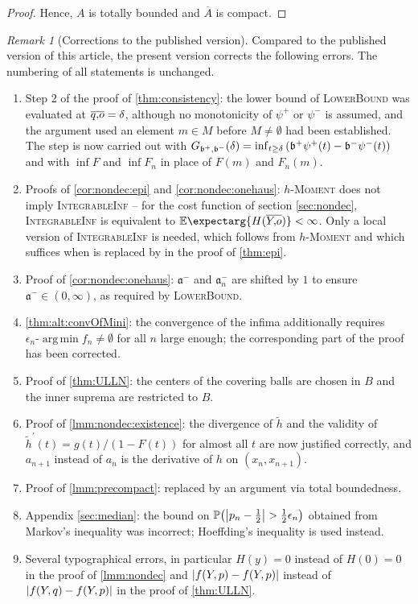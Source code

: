 \documentclass{scrartcl}
\newcommand{\PrOf}[1]{\Pr\mathopen{}\lb #1 \rb\mathclose{}}
\newcommand{\Ex}{\E\expectarg}
\newcommand*{\mf}[1]{\mathfrak{#1}}
\newcommand{\pr}{^\prime}
\DeclareMathOperator*{\argmin}{arg\,min}
\theoremstyle{plain}\newtheorem{theorem}{Theorem}[section]
\theoremstyle{definition}
\theoremstyle{remark}
\newtheorem{remark}[theorem]{Remark}
\begin{document}
\begin{appendix}
\begin{proof}
	Hence, $A$ is totally bounded and $\overline A$ is compact.
\end{proof}
\begin{remark}[Corrections to the published version]\label{rem:corrections}
	Compared to the published version of this article, the present version corrects the following errors. The numbering of all statements is unchanged.
	\begin{enumerate}[label=(\roman*)]
	\item
		Step 2 of the proof of \autoref{thm:consistency}: the lower bound of \textsc{LowerBound} was evaluated at $\overline{q,\!o} = \delta$, although no monotonicity of $\psi^+$ or $\psi^-$ is assumed, and the argument used an element $m\in M$ before $M \neq \emptyset$ had been established. The step is now carried out with $G_{\mf b^+, \mf b^-}(\delta) = \inf_{t\geq\delta}\br{\mf b^+ \psi^+(t) - \mf b^- \psi^-(t)}$ and with $\inf F$ and $\inf F_n$ in place of $F(m)$ and $F_n(m)$.
	\item
		Proofs of \autoref{cor:nondec:epi} and \autoref{cor:nondec:onehaus}: \textsc{$h$-Moment} does not imply \textsc{IntegrableInf} -- for the cost function of section \ref{sec:nondec}, \textsc{IntegrableInf} is equivalent to $\Ex{H(\ol Yo)} < \infty$. Only a local version of \textsc{IntegrableInf} is needed, which follows from \textsc{$h$-Moment} and which suffices when \cite[Theorem 1.1]{korf01} is replaced by \cite[Theorem 8.2]{korf01} in the proof of \autoref{thm:epi}.
	\item
		Proof of \autoref{cor:nondec:onehaus}: $\mf a^-$ and $\mf a^-_n$ are shifted by $1$ to ensure $\mf a^- \in (0,\infty)$, as required by \textsc{LowerBound}.
	\item
		\autoref{thm:alt:convOfMini}: the convergence of the infima additionally requires $\epsilon_n\text{-}\argmin f_n \neq \emptyset$ for all $n$ large enough; the corresponding part of the proof has been corrected.
	\item
		Proof of \autoref{thm:ULLN}: the centers of the covering balls are chosen in $B$ and the inner suprema are restricted to $B$.
	\item
		Proof of \autoref{lmm:nondec:existence}: the divergence of $\tilde h$ and the validity of $\tilde h\pr(t) = g(t)/(1-F(t))$ for almost all $t$ are now justified correctly, and $a_{n+1}$ instead of $a_n$ is the derivative of $h$ on $(x_n, x_{n+1})$.
	\item
		Proof of \autoref{lmm:precompact}: replaced by an argument via total boundedness.
	\item
		Appendix \ref{sec:median}: the bound on $\PrOf{\abs{p_n-\frac12} > \frac12\epsilon_n}$ obtained from Markov's inequality was incorrect; Hoeffding's inequality is used instead.
	\item
		Several typographical errors, in particular $H(y) = 0$ instead of $H(0) = 0$ in the proof of \autoref{lmm:nondec} and $\left| f(Y,p) - f(Y,p) \right|$ instead of $\left| f(Y,q) - f(Y,p) \right|$ in the proof of \autoref{thm:ULLN}.
	\end{enumerate}
\end{remark}
 \end{appendix}


\end{document}

